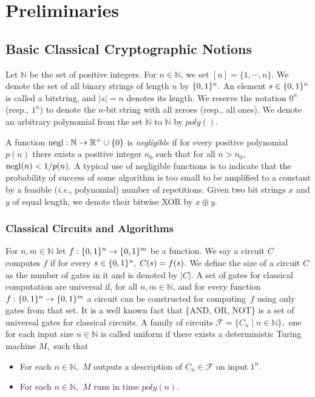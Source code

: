 \section{Preliminaries}
\subsection{Basic Classical Cryptographic Notions}
\label{sec:classical-prelims}
Let $\mathbb{N}$ be the set of positive integers. For $n \in \mathbb{N}$, we set $[n] = \{1, \cdots, n\}.$ We denote the set of all  binary strings of length $n$ by $\{0,1\}^{n}.$
 An element $s \in \{0,1\}^{n}$ is called a bitstring, and $|s|=n$ denotes its length. We reserve the notation $0^n$ (resp., $1^n$) to denote the $n$-bit string with all zeroes (resp., all ones).  We denote an arbitrary polynomial from the set $\mathbb{N}$ to $\mathbb{N}$ by $poly( ).$


A function ${\rm negl}:\mathbb{N}\rightarrow\mathbb{R}^{+}\cup \{0\}$ is \emph{negligible} if for every positive polynomial $p(n)$ there exists a positive integer $n_0$ such that  for all  $n>n_0,$ ${\rm negl}(n) < 1/ p(n).$   A typical use of negligible functions is to indicate that the probability of success of some algorithm is too small to be amplified to a constant by a feasible (\emph{i.e.}, polynomial) number of repetitions. Given two bit strings $x$ and $y$ of equal length, we denote their bitwise XOR by $x \oplus y.$

\subsubsection{Classical Circuits and Algorithms}
 For $n, m\in\mathbb{N}$ let  $f:\{0,1\}^{n}\rightarrow \{0,1\}^{m}$ be a function. We say a circuit $C$ computes $f$ if for every $s \in \{0,1\}^{n},\; C(s)=f(s).$  We define the size of a circuit $C$ as the number of gates in it and is denoted by $|C|.$ A set of gates for classical computation  are universal if, for all $n, m\in\mathbb{N}$, and for every function $f:\{0,1\}^{n}\rightarrow \{0,1\}^{m}$ a circuit can be constructed for computing~$f$ using only gates from that set. It is a well known fact that \{AND, OR, NOT\} is a set of universal gates for classical circuits. A family of circuits $\mathcal{F}=\{C_n\mid n\in\mathbb{N}\},$ one for each input  size $n\in \mathbb{N}$ is called uniform if there exists a deterministic Turing machine $M,$ such that
 \begin{itemize}
 \item For each $n\in\mathbb{N},$ $M$ outputs a description of $C_n \in \mathcal{F}$ on input $1^n.$
 \item  For each $n\in\mathbb{N},$ $M$ runs in time $poly(n).$
 \end{itemize}



